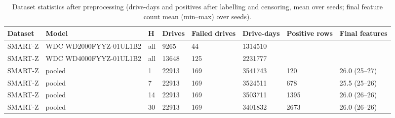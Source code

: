 \begin{table}[t]
\centering
\caption{Dataset statistics after preprocessing (drive-days and positives after labelling and censoring, mean over seeds; final feature count mean (min–max) over seeds).}
\label{tab:table6_dataset_statistics}
\footnotesize
\begin{tabular}{llllllll}
\toprule
Dataset & Model & H & Drives & Failed drives & Drive-days & Positive rows & Final features \\
\midrule
SMART-Z & WDC WD2000FYYZ-01UL1B2 & all & 9265 & 44 & 1314510 &  &  \\
SMART-Z & WDC WD4000FYYZ-01UL1B2 & all & 13648 & 125 & 2231777 &  &  \\
SMART-Z & pooled & 1 & 22913 & 169 & 3541743 & 120 & 26.0 (25–27) \\
SMART-Z & pooled & 7 & 22913 & 169 & 3524511 & 678 & 25.5 (25–26) \\
SMART-Z & pooled & 14 & 22913 & 169 & 3503711 & 1395 & 26.0 (26–26) \\
SMART-Z & pooled & 30 & 22913 & 169 & 3401832 & 2673 & 26.0 (26–26) \\
\bottomrule
\end{tabular}
\end{table}
